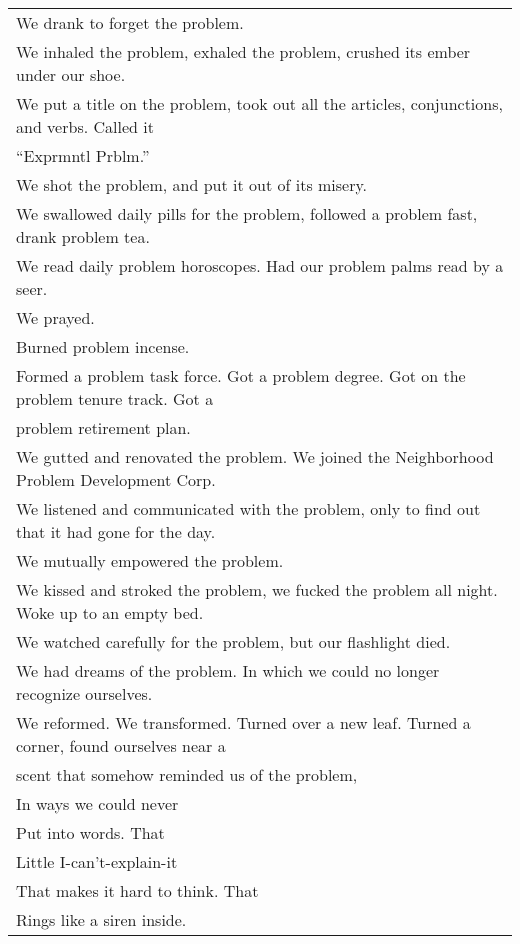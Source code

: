 \section*{\-\ \hspace*{\fill}  \thepage}
\hspace{0pt}
\vfill
\begin{center}
\begin{tabular}{l}
We drank to forget the problem.\\
We inhaled the problem, exhaled the problem, crushed its ember under our shoe.\\
We put a title on the problem, took out all the articles, conjunctions, and verbs. Called it\\
\hspace{0.3cm} “Exprmntl Prblm.”\\
We shot the problem, and put it out of its misery.\\
We swallowed daily pills for the problem, followed a problem fast, drank problem tea.\\
We read daily problem horoscopes. Had our problem palms read by a seer.\\
We prayed.\\
Burned problem incense.\\
Formed a problem task force. Got a problem degree. Got on the problem tenure track. Got a\\
\hspace{0.3cm} problem retirement plan.\\
We gutted and renovated the problem. We joined the Neighborhood Problem Development Corp.\\
We listened and communicated with the problem, only to find out that it had gone for the day.\\
We mutually empowered the problem.\\
We kissed and stroked the problem, we fucked the problem all night. Woke up to an empty bed.\\
We watched carefully for the problem, but our flashlight died.\\
We had dreams of the problem. In which we could no longer recognize ourselves.\\
We reformed. We transformed. Turned over a new leaf. Turned a corner, found ourselves near a\\
\hspace{0.3cm} scent that somehow reminded us of the problem,\\
In ways we could never\\
Put into words. That\\
Little I-can’t-explain-it\\
That makes it hard to think. That\\
Rings like a siren inside.
\end{tabular}
\end{center}
\vfill
\hspace{0pt}